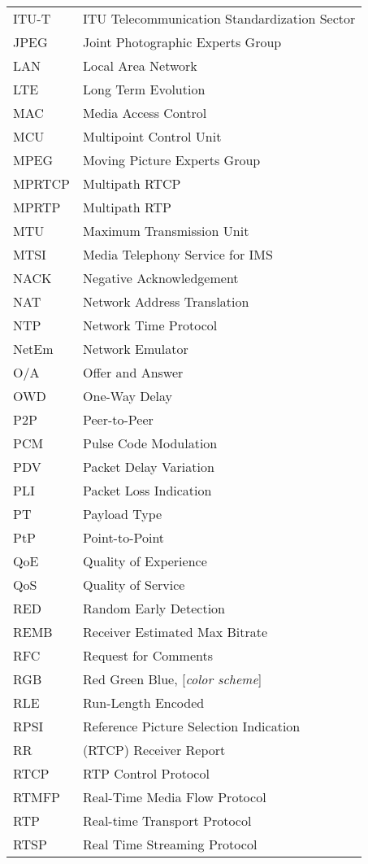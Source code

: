 \begin{longtable}{ll}
ITU-T 	& ITU Telecommunication Standardization Sector \\
JPEG 	& Joint Photographic Experts Group \\
LAN 	& Local Area Network \\
LTE 	& Long Term Evolution \\
MAC 	& Media Access Control \\
MCU 	& Multipoint Control Unit \\
MPEG 	& Moving Picture Experts Group \\
MPRTCP	& Multipath RTCP \\
MPRTP 	& Multipath RTP \\
MTU  	& Maximum Transmission Unit \\
MTSI 	& Media Telephony Service for IMS\\
NACK 	& Negative Acknowledgement \\
NAT 	& Network Address Translation \\
NTP  	& Network Time Protocol \\
NetEm 	& Network Emulator \\
O/A  	& Offer and Answer \\
OWD 	& One-Way Delay \\
P2P 	& Peer-to-Peer \\
PCM 	& Pulse Code Modulation \\
PDV  	& Packet Delay Variation \\
PLI 	& Packet Loss Indication \\
PT  	& Payload Type \\
PtP 	& Point-to-Point \\
QoE 	& Quality of Experience \\
QoS 	& Quality of Service \\
RED 	& Random Early Detection \\
REMB 	& Receiver Estimated Max Bitrate \\
RFC 	& Request for Comments \\
RGB 	& Red Green Blue, [\textit{color scheme}] \\
RLE  	& Run-Length Encoded \\
RPSI 	& Reference Picture Selection Indication \\
RR  	& (RTCP) Receiver Report \\
RTCP 	& RTP Control Protocol \\
RTMFP	& Real-Time Media Flow Protocol \\
RTP 	& Real-time Transport Protocol \\
RTSP 	& Real Time Streaming Protocol \\

\end{longtable}
